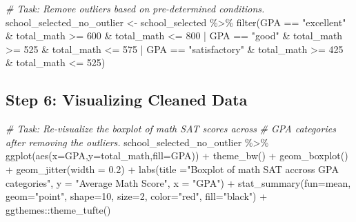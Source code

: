 \documentclass[
]{book}
\newenvironment{Shaded}{\begin{snugshade}}{\end{snugshade}}
\newcommand{\AttributeTok}[1]{\textcolor[rgb]{0.77,0.63,0.00}{#1}}
\newcommand{\CommentTok}[1]{\textcolor[rgb]{0.56,0.35,0.01}{\textit{#1}}}
\newcommand{\DecValTok}[1]{\textcolor[rgb]{0.00,0.00,0.81}{#1}}
\newcommand{\FloatTok}[1]{\textcolor[rgb]{0.00,0.00,0.81}{#1}}
\newcommand{\FunctionTok}[1]{\textcolor[rgb]{0.00,0.00,0.00}{#1}}
\newcommand{\NormalTok}[1]{#1}
\newcommand{\OtherTok}[1]{\textcolor[rgb]{0.56,0.35,0.01}{#1}}
\newcommand{\SpecialCharTok}[1]{\textcolor[rgb]{0.00,0.00,0.00}{#1}}
\newcommand{\StringTok}[1]{\textcolor[rgb]{0.31,0.60,0.02}{#1}}
\begin{document}
\begin{Shaded}
\begin{Highlighting}[]
\CommentTok{\# Task: Remove outliers based on pre{-}determined conditions.}
\NormalTok{school\_selected\_no\_outlier }\OtherTok{\textless{}{-}}\NormalTok{  school\_selected }\SpecialCharTok{\%\textgreater{}\%} 
  \FunctionTok{filter}\NormalTok{(GPA }\SpecialCharTok{==} \StringTok{"excellent"} \SpecialCharTok{\&}\NormalTok{ total\_math }\SpecialCharTok{\textgreater{}=} \DecValTok{600} \SpecialCharTok{\&}\NormalTok{  total\_math }\SpecialCharTok{\textless{}=} \DecValTok{800} \SpecialCharTok{|}
\NormalTok{           GPA }\SpecialCharTok{==} \StringTok{"good"} \SpecialCharTok{\&}\NormalTok{ total\_math }\SpecialCharTok{\textgreater{}=} \DecValTok{525}  \SpecialCharTok{\&}\NormalTok{  total\_math }\SpecialCharTok{\textless{}=} \DecValTok{575} \SpecialCharTok{|}
\NormalTok{           GPA }\SpecialCharTok{==} \StringTok{"satisfactory"} \SpecialCharTok{\&}\NormalTok{ total\_math }\SpecialCharTok{\textgreater{}=} \DecValTok{425}  \SpecialCharTok{\&}\NormalTok{  total\_math }\SpecialCharTok{\textless{}=} \DecValTok{525}\NormalTok{)}
\end{Highlighting}
\end{Shaded}

\hypertarget{step-6-visualizing-cleaned-data}{%
\subsection{Step 6: Visualizing Cleaned Data}\label{step-6-visualizing-cleaned-data}}

\begin{Shaded}
\begin{Highlighting}[]
\CommentTok{\# Task: Re{-}visualize the boxplot of math SAT scores across}
\CommentTok{\# GPA categories after removing the outliers.}
\NormalTok{school\_selected\_no\_outlier }\SpecialCharTok{\%\textgreater{}\%}
  \FunctionTok{ggplot}\NormalTok{(}\FunctionTok{aes}\NormalTok{(}\AttributeTok{x=}\NormalTok{GPA,}\AttributeTok{y=}\NormalTok{total\_math,}\AttributeTok{fill=}\NormalTok{GPA)) }\SpecialCharTok{+}
  \FunctionTok{theme\_bw}\NormalTok{() }\SpecialCharTok{+}
  \FunctionTok{geom\_boxplot}\NormalTok{() }\SpecialCharTok{+}
  \FunctionTok{geom\_jitter}\NormalTok{(}\AttributeTok{width =} \FloatTok{0.2}\NormalTok{) }\SpecialCharTok{+}
  \FunctionTok{labs}\NormalTok{(}\AttributeTok{title =}\StringTok{"Boxplot of math SAT accross GPA categories"}\NormalTok{,}
       \AttributeTok{y =} \StringTok{"Average Math Score"}\NormalTok{,}
       \AttributeTok{x =} \StringTok{"GPA"}\NormalTok{) }\SpecialCharTok{+}
  \FunctionTok{stat\_summary}\NormalTok{(}\AttributeTok{fun=}\NormalTok{mean, }\AttributeTok{geom=}\StringTok{"point"}\NormalTok{, }\AttributeTok{shape=}\DecValTok{10}\NormalTok{,}
               \AttributeTok{size=}\DecValTok{2}\NormalTok{, }\AttributeTok{color=}\StringTok{"red"}\NormalTok{, }\AttributeTok{fill=}\StringTok{"black"}\NormalTok{) }\SpecialCharTok{+}
\NormalTok{  ggthemes}\SpecialCharTok{::}\FunctionTok{theme\_tufte}\NormalTok{()}
\end{Highlighting}
\end{Shaded}
\end{document}
